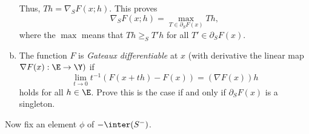 \documentclass[../borwein-lewis_notes.tex]{subfiles}
\begin{document}
\begin{enumerate}[(a),resume]
{Thus, $Th = \nabla_S F(x;h)$. This proves 
\begin{equation*}
\nabla_S F(x;h) =\max_{T\in\partial_S F(x)} Th,
\end{equation*}
where the $\max$ means that $Th\geq_S T'h$ for all $T'\in\partial_S
F(x)$.
}
\item The function $F$ is \textit{Gateaux differentiable} at $x$ 
(with derivative the linear map $\nabla F(x):\E\to\Y)$ if 
\begin{equation*}
\lim_{t\to0}t^{-1}(F(x+th)-F(x)) = (\nabla F(x))h
\end{equation*}
holds for all $h\in\E$. Prove this is the case if and only if 
$\partial_SF(x)$ is a singleton. \\
\end{enumerate}
Now fix an element $\phi$ of $-\inter(S^-)$.
\end{document}
